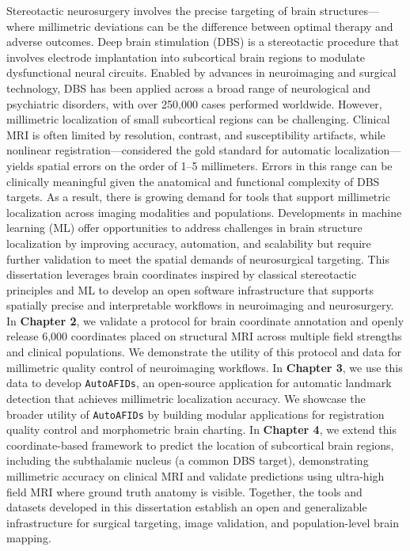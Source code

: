 \onehalfspacing
Stereotactic neurosurgery involves the precise targeting of brain structures---where millimetric deviations can be the difference between optimal therapy and adverse outcomes. Deep brain stimulation (DBS) is a stereotactic procedure that involves electrode implantation into subcortical brain regions to modulate dysfunctional neural circuits. Enabled by advances in neuroimaging and surgical technology, DBS has been applied across a broad range of neurological and psychiatric disorders, with over 250,000 cases performed worldwide. However, millimetric localization of small subcortical regions can be challenging. Clinical MRI is often limited by resolution, contrast, and susceptibility artifacts, while nonlinear registration—considered the gold standard for automatic localization—yields spatial errors on the order of 1–5 millimeters. Errors in this range can be clinically meaningful given the anatomical and functional complexity of DBS targets. As a result, there is growing demand for tools that support millimetric localization across imaging modalities and populations. Developments in machine learning (ML) offer opportunities to address challenges in brain structure localization by improving accuracy, automation, and scalability but require further validation to meet the spatial demands of neurosurgical targeting. This dissertation leverages brain coordinates inspired by classical stereotactic principles and ML to develop an open software infrastructure that supports spatially precise and interpretable workflows in neuroimaging and neurosurgery. In \textbf{Chapter 2}, we validate a protocol for brain coordinate annotation and openly release 6,000 coordinates placed on structural MRI across multiple field strengths and clinical populations. We demonstrate the utility of this protocol and data for millimetric quality control of neuroimaging workflows. In \textbf{Chapter 3}, we use this data to develop \texttt{AutoAFIDs}, an open-source application for automatic landmark detection that achieves millimetric localization accuracy. We showcase the broader utility of \texttt{AutoAFIDs} by building modular applications for registration quality control and morphometric brain charting. In \textbf{Chapter 4}, we extend this coordinate-based framework to predict the location of subcortical brain regions, including the subthalamic nucleus (a common DBS target), demonstrating millimetric accuracy on clinical MRI and validate predictions using ultra-high field MRI where ground truth anatomy is visible. Together, the tools and datasets developed in this dissertation establish an open and generalizable infrastructure for surgical targeting, image validation, and population-level brain mapping.
